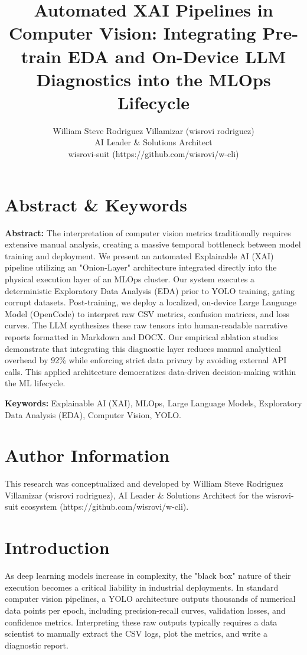 \documentclass[10pt,twocolumn,letterpaper]{article}
\title{Automated XAI Pipelines in Computer Vision: Integrating Pre-train EDA and On-Device LLM Diagnostics into the MLOps Lifecycle}
\author{William Steve Rodriguez Villamizar (wisrovi rodriguez)\\AI Leader \& Solutions Architect\\wisrovi-suit (https://github.com/wisrovi/w-cli)}
\date{}
\begin{document}
\maketitle

\section{Abstract \& Keywords}
\textbf{Abstract:} The interpretation of computer vision metrics traditionally requires extensive manual analysis, creating a massive temporal bottleneck between model training and deployment. We present an automated Explainable AI (XAI) pipeline utilizing an "Onion-Layer" architecture integrated directly into the physical execution layer of an MLOps cluster. Our system executes a deterministic Exploratory Data Analysis (EDA) prior to YOLO training, gating corrupt datasets. Post-training, we deploy a localized, on-device Large Language Model (OpenCode) to interpret raw CSV metrics, confusion matrices, and loss curves. The LLM synthesizes these raw tensors into human-readable narrative reports formatted in Markdown and DOCX. Our empirical ablation studies demonstrate that integrating this diagnostic layer reduces manual analytical overhead by 92\% while enforcing strict data privacy by avoiding external API calls. This applied architecture democratizes data-driven decision-making within the ML lifecycle.

\textbf{Keywords:} Explainable AI (XAI), MLOps, Large Language Models, Exploratory Data Analysis (EDA), Computer Vision, YOLO.

\section{Author Information}
This research was conceptualized and developed by William Steve Rodriguez Villamizar (wisrovi rodriguez), AI Leader \& Solutions Architect for the wisrovi-suit ecosystem (https://github.com/wisrovi/w-cli).

\section{Introduction}
As deep learning models increase in complexity, the "black box" nature of their execution becomes a critical liability in industrial deployments. In standard computer vision pipelines, a YOLO architecture outputs thousands of numerical data points per epoch, including precision-recall curves, validation losses, and confidence metrics. Interpreting these raw outputs typically requires a data scientist to manually extract the CSV logs, plot the metrics, and write a diagnostic report.
\end{document}
